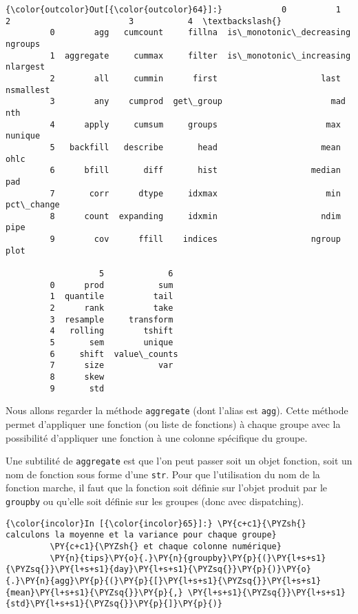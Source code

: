 \begin{Verbatim}[commandchars=\\\{\},frame=single,framerule=0.3mm,rulecolor=\color{cellframecolor}]
{\color{outcolor}Out[{\color{outcolor}64}]:}            0          1          2                        3           4  \textbackslash{}
         0        agg   cumcount     fillna  is\_monotonic\_decreasing     ngroups   
         1  aggregate     cummax     filter  is\_monotonic\_increasing    nlargest   
         2        all     cummin      first                     last   nsmallest   
         3        any    cumprod  get\_group                      mad         nth   
         4      apply     cumsum     groups                      max     nunique   
         5   backfill   describe       head                     mean        ohlc   
         6      bfill       diff       hist                   median         pad   
         7       corr      dtype     idxmax                      min  pct\_change   
         8      count  expanding     idxmin                     ndim        pipe   
         9        cov      ffill    indices                   ngroup        plot   
         
                   5             6  
         0      prod           sum  
         1  quantile          tail  
         2      rank          take  
         3  resample     transform  
         4   rolling        tshift  
         5       sem        unique  
         6     shift  value\_counts  
         7      size           var  
         8      skew                
         9       std
\end{Verbatim}
            
    Nous allons regarder la méthode \texttt{aggregate} (dont l'alias est
\texttt{agg}). Cette méthode permet d'appliquer une fonction (ou liste
de fonctions) à chaque groupe avec la possibilité d'appliquer une
fonction à une colonne spécifique du groupe.

Une subtilité de \texttt{aggregate} est que l'on peut passer soit un
objet fonction, soit un nom de fonction sous forme d'une \texttt{str}.
Pour que l'utilisation du nom de la fonction marche, il faut que la
fonction soit définie sur l'objet produit par le \texttt{groupby} ou
qu'elle soit définie sur les groupes (donc avec dispatching).

    \begin{Verbatim}[commandchars=\\\{\},frame=single,framerule=0.3mm,rulecolor=\color{cellframecolor}]
{\color{incolor}In [{\color{incolor}65}]:} \PY{c+c1}{\PYZsh{} calculons la moyenne et la variance pour chaque groupe}
         \PY{c+c1}{\PYZsh{} et chaque colonne numérique}
         \PY{n}{tips}\PY{o}{.}\PY{n}{groupby}\PY{p}{(}\PY{l+s+s1}{\PYZsq{}}\PY{l+s+s1}{day}\PY{l+s+s1}{\PYZsq{}}\PY{p}{)}\PY{o}{.}\PY{n}{agg}\PY{p}{(}\PY{p}{[}\PY{l+s+s1}{\PYZsq{}}\PY{l+s+s1}{mean}\PY{l+s+s1}{\PYZsq{}}\PY{p}{,} \PY{l+s+s1}{\PYZsq{}}\PY{l+s+s1}{std}\PY{l+s+s1}{\PYZsq{}}\PY{p}{]}\PY{p}{)}
\end{Verbatim}


